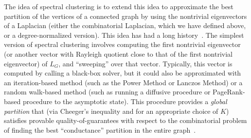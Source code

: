 \documentclass[12pt]{article}
\theoremstyle{plain}
\begin{document}

The idea of spectral clustering is to extend this idea to approximate the 
best partition of the vertices of a connected graph by using the nontrivial 
eigenvectors of a Laplacian (either the combinatorial Laplacian, which we 
have defined above, or a degree-normalized version).  
This idea has had a long history~\cite{Donath:1973,fiedler75B,spielman96_spectral,guatterymiller98,ShiMalik00_NCut}.
The simplest version of spectral clustering involves computing the first 
nontrivial eigenvector (or another vector with Rayleigh quotient close to 
that of the first nontrivial eigenvector) of $L_G$, and ``sweeping'' over 
that vector. 
Typically, this vector is computed by calling a black-box solver, but it 
could also be approximated with an iteration-based method (such as the Power
Method or Lanczos Method) or a random walk-based method (such as running a 
diffusive procedure or PageRank-based procedure to the asymptotic state).
This procedure provides a \emph{global 
partition} that (via Cheeger's inequality and for an appropriate choice of 
$K$) satisfies provable quality-of-guarantees with respect to the 
combinatorial problem of finding the best ``conductance'' partition in the 
entire graph~\cite{Mihail,spielman96_spectral,guatterymiller98}.
\end{document}
